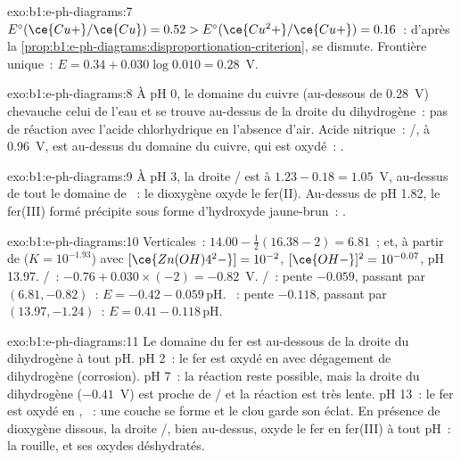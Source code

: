 \begin{solution}{exo:b1:e-ph-diagrams:7}
$E^\circ(\ce{Cu+}/\ce{Cu}) = 0.52 > E^\circ(\ce{Cu^2+}/\ce{Cu+}) = 0.16$~:
d'après la \cref{prop:b1:e-ph-diagrams:disproportionation-criterion},
 se dismute. Frontière unique~: $E = 0.34 + 0.030\log 0.010 =
0.28$~V.
\end{solution}

\begin{solution}{exo:b1:e-ph-diagrams:8}
À pH 0, le domaine du cuivre (au-dessous de 0.28~V) chevauche celui de
l'eau et se trouve au-dessus de la droite du dihydrogène~: pas de
réaction avec l'acide chlorhydrique en l'absence d'air. Acide
nitrique~: /, à 0.96~V, est au-dessus du domaine du
cuivre, qui est oxydé~:
.
\end{solution}

\begin{solution}{exo:b1:e-ph-diagrams:9}
À pH 3, la droite / est à $1.23 - 0.18 = 1.05$~V,
au-dessus de tout le domaine de ~: le dioxygène oxyde le
fer(II). Au-dessus de pH 1.82, le fer(III) formé précipite sous forme
d'hydroxyde jaune-brun~:
.
\end{solution}

\begin{solution}{exo:b1:e-ph-diagrams:10}
Verticales~: $14.00 - \frac12(16.38 - 2) = 6.81$~; et, à partir de
 ($K = 10^{-1.93}$) avec
$[\ce{Zn(OH)4^2-}] = 10^{-2}$, $[\ce{OH-}]^2 = 10^{-0.07}$, pH 13.97.
/~: $-0.76 + 0.030 \times (-2) = -0.82$~V.
/~:
pente $-0.059$, passant par $(6.81, -0.82)$~: $E = -0.42 - 0.059\,\mathrm{pH}$.
~: pente $-0.118$, passant par
$(13.97, -1.24)$~: $E = 0.41 - 0.118\,\mathrm{pH}$.
\end{solution}

\begin{solution}{exo:b1:e-ph-diagrams:11}
Le domaine du fer est au-dessous de la droite du dihydrogène à tout pH.
pH 2~: le fer est oxydé en  avec dégagement de dihydrogène
(corrosion). pH 7~: la réaction reste possible, mais la droite du
dihydrogène ($-0.41$~V) est proche de / et la réaction
est très lente. pH 13~: le fer est oxydé en , ~: une couche se forme et le clou garde son éclat. En
présence de dioxygène dissous, la droite /, bien
au-dessus, oxyde le fer en fer(III) à tout pH~: la rouille, 
et ses oxydes déshydratés.
\end{solution}

